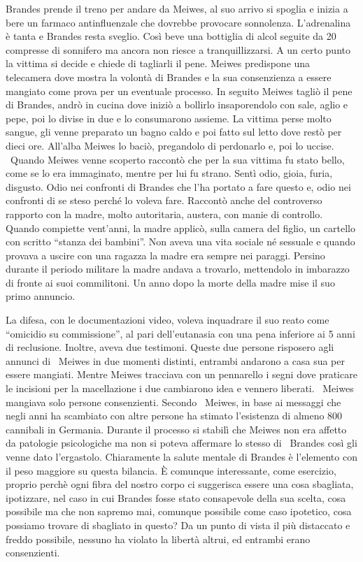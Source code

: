 Brandes prende il treno per andare da Meiwes, al suo arrivo si spoglia e inizia a bere un farmaco antinfluenzale che
dovrebbe provocare sonnolenza. L'adrenalina è tanta e Brandes resta sveglio. Così beve una
bottiglia di alcol seguite da 20 compresse di sonnifero ma ancora non riesce a tranquillizzarsi. A un certo punto la
vittima si decide e chiede di tagliarli il pene. Meiwes predispone una telecamera dove mostra la volontà di Brandes e
la sua consenzienza a essere mangiato come prova per un eventuale processo. In seguito Meiwes tagliò il pene di
Brandes, andrò in cucina dove iniziò a bollirlo insaporendolo con sale, aglio e pepe, poi lo divise in due e lo
consumarono assieme. La vittima perse molto sangue, gli venne preparato un bagno caldo e poi fatto sul letto dove restò
per dieci ore. All'alba Meiwes lo baciò, pregandolo di perdonarlo e, poi lo uccise. \ Quando
Meiwes venne scoperto raccontò che per la sua vittima fu stato bello, come se lo era immaginato, mentre per lui fu
strano. Sentì odio, gioia, furia, disgusto. Odio nei confronti di Brandes che l'ha portato a fare
questo e, odio nei confronti di se steso perché lo voleva fare. Raccontò anche del controverso rapporto con la madre,
molto autoritaria, austera, con manie di controllo. Quando compiette vent'anni, la madre applicò,
sulla camera del figlio, un cartello con scritto “stanza dei bambini”. Non aveva una vita sociale né sessuale e quando
provava a uscire con una ragazza la madre era sempre nei paraggi. Persino durante il periodo militare la madre andava a
trovarlo, mettendolo in imbarazzo di fronte ai suoi commilitoni. Un anno dopo la morte della madre mise il suo primo
annuncio.

La difesa, con le documentazioni video, voleva inquadrare il suo reato come “omicidio su commissione”, al pari
dell'eutanasia con una pena inferiore ai 5 anni di reclusione. Inoltre, aveva due testimoni.
Queste due persone risposero agli annunci di \ Meiwes in due momenti distinti, entrambi andarono a casa sua per essere
mangiati. Mentre Meiwes tracciava con un pennarello i segni dove praticare le incisioni per la macellazione i due
cambiarono idea e vennero liberati. \ Meiwes mangiava solo persone consenzienti. Secondo \ Meiwes, in base ai messaggi
che negli anni ha scambiato con altre persone ha stimato l'esistenza di almeno 800 cannibali in
Germania. Durante il processo si stabilì che Meiwes non era affetto da patologie psicologiche ma non si poteva
affermare lo stesso di \ Brandes così gli venne dato l'ergastolo. Chiaramente la salute mentale di
Brandes è l'elemento con il peso maggiore su questa bilancia. È comunque interessante, come
esercizio, proprio perchè ogni fibra del nostro corpo ci suggerisca essere una cosa sbagliata, ipotizzare, nel caso in
cui Brandes fosse stato consapevole della sua scelta, cosa possibile ma che non sapremo mai, comunque possibile come
caso ipotetico, cosa possiamo trovare di sbagliato in questo? Da un punto di vista il più distaccato e freddo
possibile, nessuno ha violato la libertà altrui, ed entrambi erano consenzienti.

